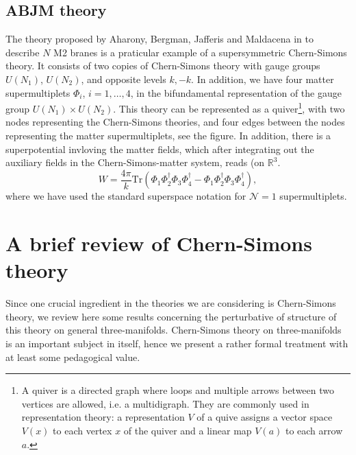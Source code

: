 \subsection{ABJM theory}
The theory proposed by Aharony, Bergman, Jafferis and Maldacena in \cite{Aharony08, Aharony08v2} to describe $N$ M2 branes
is a praticular example of a supersymmetric Chern-Simons theory. It consists of
two copies of Chern-Simons theory with gauge groups $U(N_1)$, $U(N_2)$, and
opposite levels $k, -k$. In addition, we have four matter supermultiplets
$\Phi_i$, $i=1,\dots,4$, in the bifundamental representation of the 
gauge group $U(N_1)\times U(N_2)$. This theory can be represented
as a quiver\footnote{A quiver is a directed graph where loops and multiple
  arrows between two vertices are allowed, i.e. a multidigraph. They are
  commonly used in representation theory: a representation $V$ of a
  quive assigns a vector space $V(x)$ to each vertex $x$ of the
quiver and a linear map $V(a)$ to each arrow $a$.}, with two nodes representing the Chern-Simons theories,
 and four edges between the nodes representing the matter supermultiplets, see
 the figure. In addition, there is a superpotential invloving the matter
 fields, which after integrating out the auxiliary fields in the
 Chern-Simons-matter system, reads (on $\mathbb{R}^3$.
 \begin{equation}
   W = \frac{4\pi}{k}\mathrm{Tr}\left(\Phi_1\Phi_2^\dagger\Phi_3\Phi_4^\dagger
   - \Phi_1\Phi_2^\dagger\Phi_3\Phi_4^\dagger\right),
 \end{equation}
 where we have used the standard superspace notation for $\mathcal{N}=1$
 supermultiplets.
 \section{A brief review of Chern-Simons theory}
 Since one crucial ingredient in the theories we are considering is
 Chern-Simons theory, we review here some results concerning the perturbative
 of structure of this theory on general three-manifolds. Chern-Simons theory on
 three-manifolds is an important subject in itself, hence we present a rather
 formal treatment with at least some pedagogical value.
